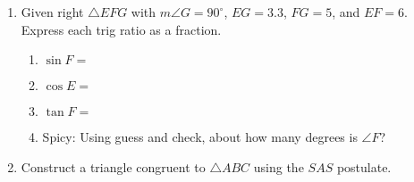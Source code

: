 \documentclass[12pt, oneside]{article}
\begin{document}
\begin{enumerate}
  \item Given right $\triangle EFG$ with $m\angle G=90^\circ$, $EG=3.3$, $FG=5$, and $EF=6$. Express each trig ratio as a fraction.  \vspace{0.5cm}
  \begin{multicols}{2}
    \begin{enumerate}
      \item $\sin F=$ \vspace{0.8cm}
      \item $\cos E=$ \vspace{0.8cm}
      \item $\tan F=$ \vspace{0.8cm}
      \item Spicy: Using guess and check, about how many degrees is $\angle F$?
    \end{enumerate}
    \begin{center}
        \vspace{2cm}
    \end{center}

  \end{multicols}
\vspace{2cm}

  \item Construct a triangle congruent to $\triangle ABC$ using the $SAS$ postulate.\\[2cm]


\end{enumerate}
\end{document}
